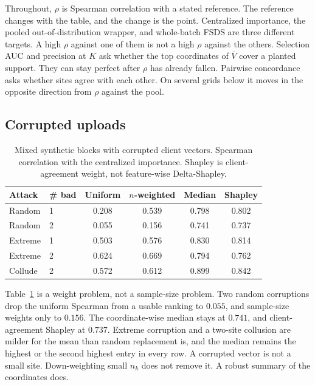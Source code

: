 Throughout, $\rho$ is Spearman correlation with a stated reference.
The reference changes with the table, and the change is the point.
Centralized importance, the pooled out-of-distribution wrapper, and
whole-batch FSDS are three different targets.
A high $\rho$ against one of them is not a high $\rho$ against the others.
Selection AUC and precision at $K$ ask whether the top coordinates of
$\bar V$ cover a planted support.
They can stay perfect after $\rho$ has already fallen.
Pairwise concordance asks whether sites agree with each other.
On several grids below it moves in the opposite direction from $\rho$
against the pool.

\subsection{Corrupted uploads}
\label{sec:attack}

\begin{table}[t]
\centering
\caption{Mixed synthetic blocks with corrupted client vectors.
Spearman correlation with the centralized importance.
Shapley is client-agreement weight, not feature-wise Delta-Shapley.}
\label{tab:fed-vimp-attack}
\begin{tabular}{llcccc}
\toprule
Attack & \# bad & Uniform & $n$-weighted & Median & Shapley \\
\midrule
Random & 1 & 0.208 & 0.539 & 0.798 & 0.802 \\
Random & 2 & 0.055 & 0.156 & 0.741 & 0.737 \\
Extreme & 1 & 0.503 & 0.576 & 0.830 & 0.814 \\
Extreme & 2 & 0.624 & 0.669 & 0.794 & 0.762 \\
Collude & 2 & 0.572 & 0.612 & 0.899 & 0.842 \\
\bottomrule
\end{tabular}
\end{table}

Table~\ref{tab:fed-vimp-attack} is a weight problem, not a sample-size
problem.
Two random corruptions drop the uniform Spearman from a usable ranking to
$0.055$, and sample-size weights only to $0.156$.
The coordinate-wise median stays at $0.741$, and client-agreement Shapley
at $0.737$.
Extreme corruption and a two-site collusion are milder for the mean than
random replacement is, and the median remains the highest or the second
highest entry in every row.
A corrupted vector is not a small site.
Down-weighting small $n_k$ does not remove it.
A robust summary of the coordinates does.

